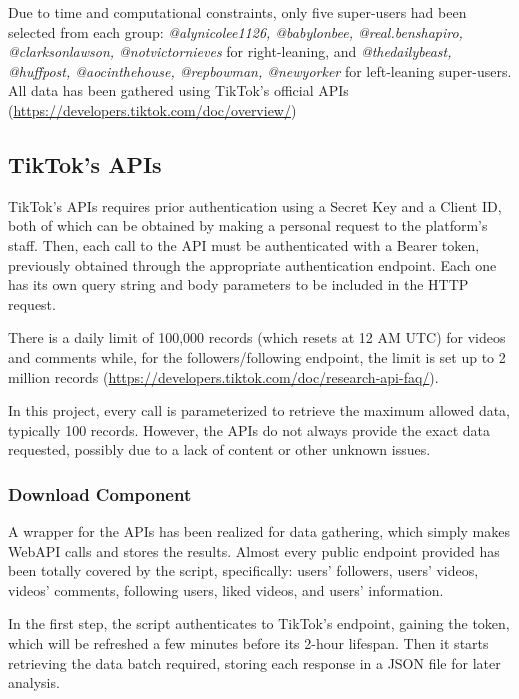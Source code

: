 Due to time and computational constraints, only five super-users had been selected from each group: \textit{@alynicolee1126, @babylonbee, @real.benshapiro, @clarksonlawson, @notvictornieves} for right-leaning, and \textit{@thedailybeast, @huffpost, @aocinthehouse, @repbowman, @newyorker} for left-leaning super-users. \\
All data has been gathered using TikTok's official APIs (\url{https://developers.tiktok.com/doc/overview/})

\subsection{TikTok's APIs}

TikTok's APIs requires prior authentication using a Secret Key and a Client ID, both of which can be obtained by making a personal request to the platform's staff. 
Then, each call to the API must be authenticated with a Bearer token, previously obtained through the appropriate authentication endpoint. Each one has its own query string and body parameters to be included in the HTTP request.

There is a daily limit of 100,000 records (which resets at 12 AM UTC) for videos and comments while, for the followers/following endpoint, the limit is set up to 2 million records (\url{https://developers.tiktok.com/doc/research-api-faq/}).

In this project, every call is parameterized to retrieve the maximum allowed data, typically 100 records. However, the APIs do not always provide the exact data requested, possibly due to a lack of content or other unknown issues.

\subsubsection*{Download Component}

A wrapper for the APIs has been realized for data gathering, which simply makes WebAPI calls and stores the results.
Almost every public endpoint provided has been totally covered by the script, specifically: users' followers, users' videos, videos' comments, following users, liked videos, and users' information.

In the first step, the script authenticates to TikTok's endpoint, gaining the token, which will be refreshed a few minutes before its 2-hour lifespan. Then it starts retrieving the data batch required, storing each response in a JSON file for later analysis.

